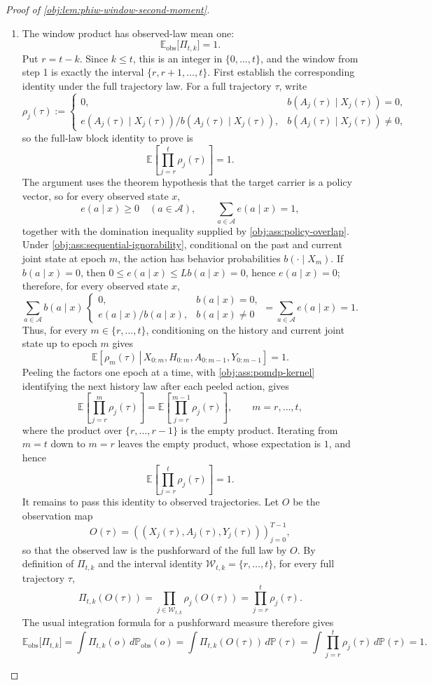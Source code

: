 \begin{proof}[Proof of \cref{obj:lem:phiw-window-second-moment}]
\begin{enumerate}
\item
The window product has observed-law mean one:
\[
\mathbb E_{\mathrm{obs}}\bigl[\Pi_{t,k}\bigr]=1.
\]
Put \(r=t-k\). Since \(k\le t\), this is an integer in \(\{0,\ldots,t\}\), and the window from step 1 is exactly the interval \(\{r,r+1,\ldots,t\}\). First establish the corresponding identity under the full trajectory law. For a full trajectory \(\tau\), write
\[
\rho_j(\tau)
:=
\begin{cases}
0, & b(A_j(\tau)\mid X_j(\tau))=0,\\[1mm]
e(A_j(\tau)\mid X_j(\tau))/b(A_j(\tau)\mid X_j(\tau)),
& b(A_j(\tau)\mid X_j(\tau))\ne 0,
\end{cases}
\]
so the full-law block identity to prove is
\[
\mathbb E\!\left[\prod_{j=r}^{t}\rho_j(\tau)\right]=1.
\]
The argument uses the theorem hypothesis that the target carrier is a policy vector, so for every observed state \(x\),
\[
e(a\mid x)\ge 0\quad(a\in\mathcal A),
\qquad
\sum_{a\in\mathcal A}e(a\mid x)=1,
\]
together with the domination inequality supplied by \cref{obj:ass:policy-overlap}. Under \cref{obj:ass:sequential-ignorability}, conditional on the past and current joint state at epoch \(m\), the action has behavior probabilities \(b(\cdot\mid X_m)\). If \(b(a\mid x)=0\), then \(0\le e(a\mid x)\le Lb(a\mid x)=0\), hence \(e(a\mid x)=0\); therefore, for every observed state \(x\),
\[
\sum_{a\in\mathcal A} b(a\mid x)\,
\begin{cases}
0, & b(a\mid x)=0,\\[1mm]
e(a\mid x)/b(a\mid x), & b(a\mid x)\ne 0
\end{cases}
=
\sum_{a\in\mathcal A}e(a\mid x)=1.
\]
Thus, for every \(m\in\{r,\ldots,t\}\), conditioning on the history and current joint state up to epoch \(m\) gives
\[
\mathbb E\!\left[\left.\rho_m(\tau)\,\right|\,
X_{0:m},H_{0:m},A_{0:m-1},Y_{0:m-1}\right]=1.
\]
Peeling the factors one epoch at a time, with \cref{obj:ass:pomdp-kernel} identifying the next history law after each peeled action, gives
\[
\mathbb E\!\left[\prod_{j=r}^{m}\rho_j(\tau)\right]
=
\mathbb E\!\left[\prod_{j=r}^{m-1}\rho_j(\tau)\right],
\qquad m=r,\ldots,t,
\]
where the product over \(\{r,\ldots,r-1\}\) is the empty product. Iterating from \(m=t\) down to \(m=r\) leaves the empty product, whose expectation is \(1\), and hence
\[
\mathbb E\!\left[\prod_{j=r}^{t}\rho_j(\tau)\right]=1.
\]
It remains to pass this identity to observed trajectories. Let \(O\) be the observation map
\[
O(\tau)=((X_j(\tau),A_j(\tau),Y_j(\tau)))_{j=0}^{T-1},
\]
so that the observed law is the pushforward of the full law by \(O\). By definition of \(\Pi_{t,k}\) and the interval identity \(\mathcal W_{t,k}=\{r,
\ldots,t\}\), for every full trajectory \(\tau\),
\[
\Pi_{t,k}(O(\tau))
=
\prod_{j\in\mathcal W_{t,k}}\rho_j(O(\tau))
=
\prod_{j=r}^{t}\rho_j(\tau).
\]
The usual integration formula for a pushforward measure therefore gives
\[
\mathbb E_{\mathrm{obs}}\bigl[\Pi_{t,k}\bigr]
=
\int \Pi_{t,k}(o)\,d\mathbb P_{\mathrm{obs}}(o)
=
\int \Pi_{t,k}(O(\tau))\,d\mathbb P(\tau)
=
\int \prod_{j=r}^{t}\rho_j(\tau)\,d\mathbb P(\tau)
=1.
\]


\end{enumerate}
\end{proof}

